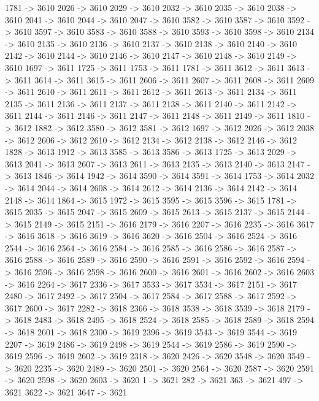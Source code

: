 {	1781 -> 3610
	2026 -> 3610
	2029 -> 3610
	2032 -> 3610
	2035 -> 3610
	2038 -> 3610
	2041 -> 3610
	2044 -> 3610
	2047 -> 3610
	3582 -> 3610
	3587 -> 3610
	3592 -> 3610
	3597 -> 3610
	3583 -> 3610
	3588 -> 3610
	3593 -> 3610
	3598 -> 3610
	2134 -> 3610
	2135 -> 3610
	2136 -> 3610
	2137 -> 3610
	2138 -> 3610
	2140 -> 3610
	2142 -> 3610
	2144 -> 3610
	2146 -> 3610
	2147 -> 3610
	2148 -> 3610
	2149 -> 3610
	1697 -> 3611
	1725 -> 3611
	1753 -> 3611
	1781 -> 3611
	3612 -> 3611
	3613 -> 3611
	3614 -> 3611
	3615 -> 3611
	2606 -> 3611
	2607 -> 3611
	2608 -> 3611
	2609 -> 3611
	2610 -> 3611
	2611 -> 3611
	2612 -> 3611
	2613 -> 3611
	2134 -> 3611
	2135 -> 3611
	2136 -> 3611
	2137 -> 3611
	2138 -> 3611
	2140 -> 3611
	2142 -> 3611
	2144 -> 3611
	2146 -> 3611
	2147 -> 3611
	2148 -> 3611
	2149 -> 3611
	1810 -> 3612
	1882 -> 3612
	3580 -> 3612
	3581 -> 3612
	1697 -> 3612
	2026 -> 3612
	2038 -> 3612
	2606 -> 3612
	2610 -> 3612
	2134 -> 3612
	2138 -> 3612
	2146 -> 3612
	1828 -> 3613
	1912 -> 3613
	3585 -> 3613
	3586 -> 3613
	1725 -> 3613
	2029 -> 3613
	2041 -> 3613
	2607 -> 3613
	2611 -> 3613
	2135 -> 3613
	2140 -> 3613
	2147 -> 3613
	1846 -> 3614
	1942 -> 3614
	3590 -> 3614
	3591 -> 3614
	1753 -> 3614
	2032 -> 3614
	2044 -> 3614
	2608 -> 3614
	2612 -> 3614
	2136 -> 3614
	2142 -> 3614
	2148 -> 3614
	1864 -> 3615
	1972 -> 3615
	3595 -> 3615
	3596 -> 3615
	1781 -> 3615
	2035 -> 3615
	2047 -> 3615
	2609 -> 3615
	2613 -> 3615
	2137 -> 3615
	2144 -> 3615
	2149 -> 3615
	2151 -> 3616
	2179 -> 3616
	2207 -> 3616
	2235 -> 3616
	3617 -> 3616
	3618 -> 3616
	3619 -> 3616
	3620 -> 3616
	2504 -> 3616
	2524 -> 3616
	2544 -> 3616
	2564 -> 3616
	2584 -> 3616
	2585 -> 3616
	2586 -> 3616
	2587 -> 3616
	2588 -> 3616
	2589 -> 3616
	2590 -> 3616
	2591 -> 3616
	2592 -> 3616
	2594 -> 3616
	2596 -> 3616
	2598 -> 3616
	2600 -> 3616
	2601 -> 3616
	2602 -> 3616
	2603 -> 3616
	2264 -> 3617
	2336 -> 3617
	3533 -> 3617
	3534 -> 3617
	2151 -> 3617
	2480 -> 3617
	2492 -> 3617
	2504 -> 3617
	2584 -> 3617
	2588 -> 3617
	2592 -> 3617
	2600 -> 3617
	2282 -> 3618
	2366 -> 3618
	3538 -> 3618
	3539 -> 3618
	2179 -> 3618
	2483 -> 3618
	2495 -> 3618
	2524 -> 3618
	2585 -> 3618
	2589 -> 3618
	2594 -> 3618
	2601 -> 3618
	2300 -> 3619
	2396 -> 3619
	3543 -> 3619
	3544 -> 3619
	2207 -> 3619
	2486 -> 3619
	2498 -> 3619
	2544 -> 3619
	2586 -> 3619
	2590 -> 3619
	2596 -> 3619
	2602 -> 3619
	2318 -> 3620
	2426 -> 3620
	3548 -> 3620
	3549 -> 3620
	2235 -> 3620
	2489 -> 3620
	2501 -> 3620
	2564 -> 3620
	2587 -> 3620
	2591 -> 3620
	2598 -> 3620
	2603 -> 3620
	1 -> 3621
	282 -> 3621
	363 -> 3621
	497 -> 3621
	3622 -> 3621
	3647 -> 3621
}

